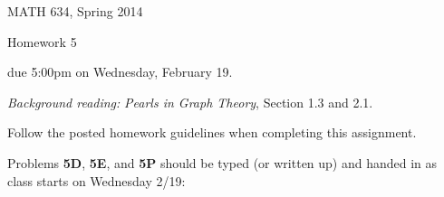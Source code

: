 \documentclass[12pt]{article}
\begin{document}
\pagestyle{empty}


\begin{center}\large 
MATH 634, Spring 2014

{\sc Homework 5}

due 5:00{\sc pm} on Wednesday, February 19.
\end{center}

\noindent
{\em Background reading:} {\em Pearls in Graph Theory}, Section 1.3 and 2.1.

\smallskip\noindent
{\color{red} Follow the posted homework guidelines when completing this assignment.}

\smallskip\noindent
Problems {\bf 5D}, {\bf 5E}, and {\bf 5P} should be typed (or written up) and handed in as class starts on Wednesday 2/19:
\end{document}
